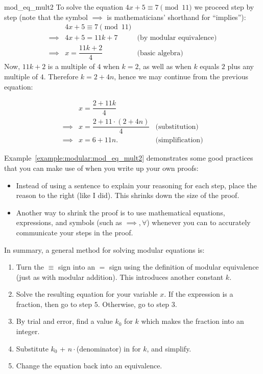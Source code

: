 \begin{example}{mod_eq_mult2}
To solve the equation $4x + 5 \equiv 7 \pmod{11}$ we proceed step by step (note that the symbol $\implies$ is mathematicians' shorthand for ``implies''):
\begin{align*}
&4x + 5 \equiv 7 \pmod{11} \\
 \implies &4x + 5 = 11k + 7&\text{(by modular equivalence)}\\ 
\implies &x = \dfrac{11k + 2}{4}&\text{(basic algebra)}
\end{align*}
Now, $11k + 2$ is a multiple of $4$ when $k = 2$, as well as when $k$ equals $2$ plus any multiple of $4$. 
Therefore $k = 2 + 4n$, hence we may continue from the previous equation:

\begin{align*}
&x = \dfrac{2 + 11k }{4}\\
\implies &x = \dfrac{ 2 + 11 \cdot (2 + 4n)}{4} &\text{(substitution)} \\
\implies &x = 6 + 11n. &\text{(simplification)}
\end{align*}
\end{example}

\begin{rem}
Example~\ref{example:modular:mod_eq_mult2} demonstrates some good practices that you can make use of when you write up your own proofs:
\begin{itemize}
\item
Instead of using a sentence to explain your reasoning for each step, place the reason to the right (like I did).  This shrinks down the size of the proof.
\item  
Another way to shrink the proof is to use mathematical equations, expressions, and symbols (such as $\implies, \forall$) whenever you can to accurately communicate your steps in the proof.  
\end{itemize}
\end{rem}



In summary, a general method for solving modular equations is:

\begin{enumerate}[1.]
\item
Turn the $ \equiv $ sign into an $=$ sign using the definition of modular equivalence (just as with modular addition). This introduces another constant $k$.
\item
Solve the resulting equation for your variable $x$. If the expression is a fraction, then
 go to step $5$.
Otherwise, go to step $3$.
\item
By trial and error, find a value $k_0$ for $k$ which makes the fraction into an integer.
\item
Substitute  $k_0$ + $n \cdot$(denominator) in for $k$, and simplify.
\item
Change the equation back into an equivalence.
\end{enumerate}

